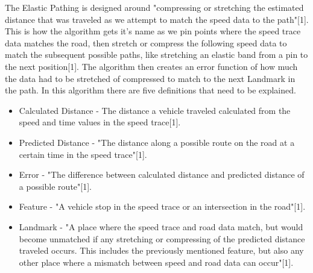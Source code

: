 \documentclass[11pt]{article}
\begin{document}
The Elastic Pathing is designed around "compressing or stretching the estimated distance that was traveled as we attempt to match the speed data to the path"[1]. This is how the algorithm gets it's name as we pin points where the speed trace data matches the road, then stretch or compress the following speed data to match the subsequent possible paths, like stretching an elastic band from a pin to the next position[1]. The algorithm then creates an error function of how much the data had to be stretched of compressed to match to the next Landmark in the path. In this algorithm there are five definitions that need to be explained.
\begin{itemize}
\item Calculated Distance - The distance a vehicle traveled calculated from the speed and time values in the speed trace[1].
\item Predicted Distance - "The distance along a possible route on the road at a certain time in the speed trace"[1].
\item Error - "The difference between calculated distance and predicted distance of a possible route"[1].
\item Feature - "A vehicle stop in the speed trace or an intersection in the road"[1].
\item Landmark - "A place where the speed trace and road data match, but would become unmatched if any stretching or compressing of the predicted distance traveled occurs. This includes the previously mentioned feature, but also any other place where a mismatch between speed and road data can occur"[1]. 
\end{itemize}
\end{document}
